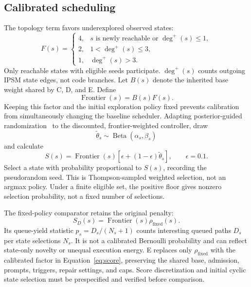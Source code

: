 \documentclass[final,5p,times,number]{elsarticle}
\begin{document}
\subsection{Calibrated scheduling}
The topology term favors underexplored observed states:
\begin{equation}
F(s)=
\begin{cases}
4,&s\text{ is newly reachable or }\deg^+(s)\leq1,\\
2,&1<\deg^+(s)\leq3,\\
1,&\deg^+(s)>3.
\end{cases}
\end{equation}
Only reachable states with eligible seeds participate. $\deg^+(s)$ counts outgoing IPSM state edges, not code branches. Let $B(s)$ denote the inherited base weight shared by C, D, and E. Define
\begin{equation}
\operatorname{Frontier}(s)=B(s)F(s).
\end{equation}
Keeping this factor and the initial exploration policy fixed prevents calibration from simultaneously changing the baseline scheduler. Adapting posterior-guided randomization~\cite{thompson1933} to the discounted, frontier-weighted controller, draw
\begin{equation}
\widetilde{\theta}_s\sim\operatorname{Beta}(\alpha_s,\beta_s)
\end{equation}
and calculate
\begin{equation}
S(s)=\operatorname{Frontier}(s)[\epsilon+(1-\epsilon)\widetilde{\theta}_s],
\qquad\epsilon=0.1.
\label{eq:score}
\end{equation}
Select a state with probability proportional to $S(s)$, recording the pseudorandom seed. This is Thompson-sampled weighted selection, not an argmax policy. Under a finite eligible set, the positive floor gives nonzero selection probability, not a fixed number of selections.

The fixed-policy comparator retains the original penalty:
\begin{equation}
S_D(s)=\operatorname{Frontier}(s)\rho_{\mathrm{fixed}}(s).
\end{equation}
Its queue-yield statistic $p_s=D_s/(N_s+1)$ counts interesting queued paths $D_s$ per state selections $N_s$. It is not a calibrated Bernoulli probability and can reflect state-only novelty or unequal execution energy. E replaces only $\rho_{\mathrm{fixed}}$ with the calibrated factor in Equation~\ref{eq:score}, preserving the shared base, admission, prompts, triggers, repair settings, and caps. Score discretization and initial cyclic state selection must be prespecified and verified before comparison.
\end{document}
